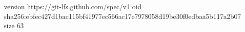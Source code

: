 version https://git-lfs.github.com/spec/v1
oid sha256:ebfec427d1bac115bf41977ec566ac17e7978058d19be30f0edbaa5b117a2b07
size 63
